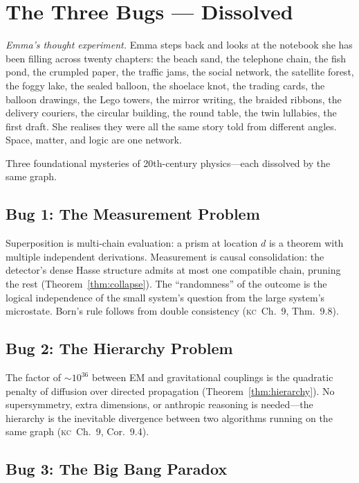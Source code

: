 \documentclass[11pt, a4paper, openany]{book}
\newcommand{\KC}[1]{\textnormal{(\textsc{kc}~#1)}}
\newcounter{thm}[chapter]
\begin{document}
\section{The Three Bugs --- Dissolved}\label{sec:bugs}

\smallskip\noindent
\textit{Emma's thought experiment.}
Emma steps back and looks at the notebook she has been filling across
twenty chapters: the beach sand, the telephone chain, the fish pond, the
crumpled paper, the traffic jams, the social network, the satellite
forest, the foggy lake, the sealed balloon, the shoelace knot, the
trading cards, the balloon drawings, the Lego towers, the mirror
writing, the braided ribbons, the delivery couriers, the circular
building, the round table, the twin lullabies, the first draft. She
realises they were all the same story told from different angles. Space,
matter, and logic are one network.
\smallskip

\noindent
Three foundational mysteries of 20th-century physics---each dissolved by
the same graph.

\subsection{Bug 1: The Measurement Problem}

Superposition is multi-chain evaluation: a prism at location $d$ is a
theorem with multiple independent derivations. Measurement is causal
consolidation: the detector's dense Hasse structure admits at most one
compatible chain, pruning the rest (Theorem~\ref{thm:collapse}). The
``randomness'' of the outcome is the logical independence of the small
system's question from the large system's microstate. Born's rule
follows from double consistency \KC{Ch.~9, Thm.~9.8}.

\subsection{Bug 2: The Hierarchy Problem}

The factor of $\sim 10^{36}$ between EM and gravitational couplings is
the quadratic penalty of diffusion over directed propagation
(Theorem~\ref{thm:hierarchy}). No supersymmetry, extra dimensions, or
anthropic reasoning is needed---the hierarchy is the inevitable
divergence between two algorithms running on the same graph
\KC{Ch.~9, Cor.~9.4}.

\subsection{Bug 3: The Big Bang Paradox}
\end{document}
